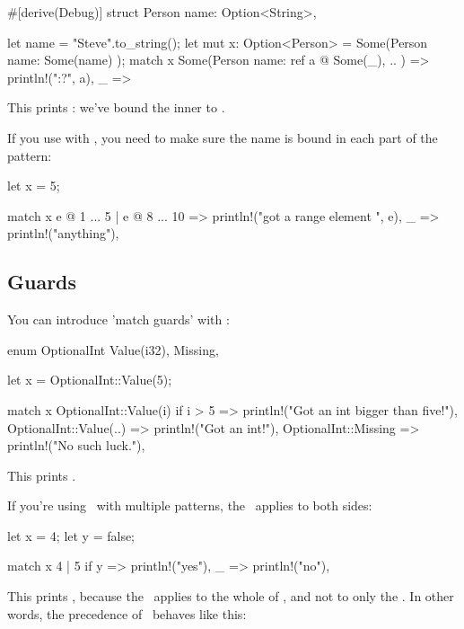 \begin{rustc}
#[derive(Debug)]
struct Person {
    name: Option<String>,
}

let name = "Steve".to_string();
let mut x: Option<Person> = Some(Person { name: Some(name) });
match x {
    Some(Person { name: ref a @ Some(_), .. }) => println!("{:?}", a),
    _ => {}
}
\end{rustc}

This prints : we've bound the inner  to .

\blank

If you use  with \code{|}, you need to make sure the name is bound in each part of the pattern:

\begin{rustc}
let x = 5;

match x {
    e @ 1 ... 5 | e @ 8 ... 10 => println!("got a range element {}", e),
    _ => println!("anything"),
}
\end{rustc}

\subsection*{Guards}

You can introduce 'match guards' with \keyif:

\begin{rustc}
enum OptionalInt {
    Value(i32),
    Missing,
}

let x = OptionalInt::Value(5);

match x {
    OptionalInt::Value(i) if i > 5 => println!("Got an int bigger than five!"),
    OptionalInt::Value(..) => println!("Got an int!"),
    OptionalInt::Missing => println!("No such luck."),
}
\end{rustc}

This prints .

\blank

If you're using \keyif\ with multiple patterns, the \keyif\ applies to both sides:

\begin{rustc}
let x = 4;
let y = false;

match x {
    4 | 5 if y => println!("yes"),
    _ => println!("no"),
}
\end{rustc}

This prints , because the \keyif\ applies to the whole of , and not to only the . In other words, 
the precedence of \keyif\ behaves like this:

